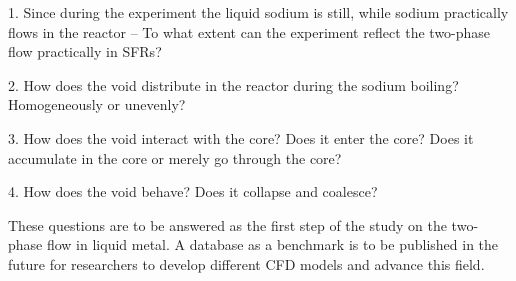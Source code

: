 \documentclass{article}
\begin{document}
1. Since during the experiment the liquid sodium is still, while sodium practically flows in the reactor -- To what extent can the experiment reflect the two-phase flow practically in SFRs? 

2. How does the void distribute in the reactor during the sodium boiling? Homogeneously or unevenly?

3. How does the void interact with the core? Does it enter the core? Does it accumulate in the core or merely go through the core?

4. How does the void behave? Does it collapse and coalesce?

These questions are to be answered as the first step of the study on the two-phase flow in liquid metal. A database as a benchmark is to be published in the future for researchers to develop different CFD models and advance this field.







\end{document}
